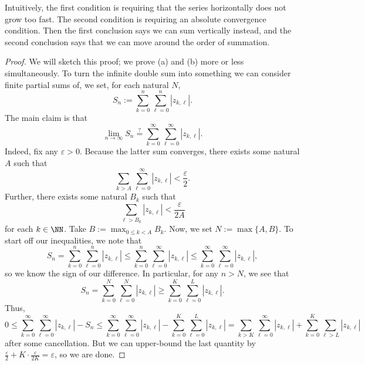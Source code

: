 Intuitively, the first condition is requiring that the series horizontally does not grow too fast. The second condition is requiring an absolute convergence condition. Then the first conclusion says we can sum vertically instead, and the second conclusion says that we can move around the order of summation.
\begin{proof}
	We will sketch this proof; we prove (a) and (b) more or less simultaneously. To turn the infinite double sum into something we can consider finite partial sums of, we set, for each natural $N$,
	\[S_n:=\sum_{k=0}^n\sum_{\ell=0}^n|z_{k,\ell}|.\]
	The main claim is that
	\[\lim_{n\to\infty}S_n\stackrel?=\sum_{k=0}^\infty\sum_{\ell=0}^\infty|z_{k,\ell}|.\]
	Indeed, fix any $\varepsilon>0$. Because the latter sum converges, there exists some natural $A$ such that
	\[\sum_{k>A}\sum_{\ell=0}^\infty|z_{k,\ell}|<\frac\varepsilon2.\]
	Further, there exists some natural $B_k$ such that
	\[\sum_{\ell>B_k}|z_{k,\ell}|<\frac\varepsilon{2A}\]
	for each $k\in\NN$. Take $B:=\max_{0\le k<A}B_k$. Now, we set $N:=\max\{A,B\}$. To start off our inequalities, we note that
	\[S_n=\sum_{k=0}^n\sum_{\ell=0}^n|z_{k,\ell}|\le\sum_{k=0}^n\sum_{\ell=0}^\infty|z_{k,\ell}|\le\sum_{k=0}^\infty\sum_{\ell=0}^\infty|z_{k,\ell}|,\]
	so we know the sign of our difference. In particular, for any $n>N$, we see that
	\[S_n=\sum_{k=0}^N\sum_{\ell=0}^N|z_{k,\ell}|\ge\sum_{k=0}^K\sum_{\ell=0}^L|z_{k,\ell}|.\]
	Thus,
	\[0\le\sum_{k=0}^\infty\sum_{\ell=0}^\infty|z_{k,\ell}|-S_n\le\sum_{k=0}^\infty\sum_{\ell=0}^\infty|z_{k,\ell}|-\sum_{k=0}^K\sum_{\ell=0}^L|z_{k,\ell}|=\sum_{k>K}\sum_{\ell=0}^\infty|z_{k,\ell}|+\sum_{k=0}^K\sum_{\ell>L}|z_{k,\ell}|\]
	after some cancellation. But we can upper-bound the last quantity by $\frac\varepsilon2+K\cdot\frac\varepsilon{2K}=\varepsilon$, so we are done.


\end{proof}
